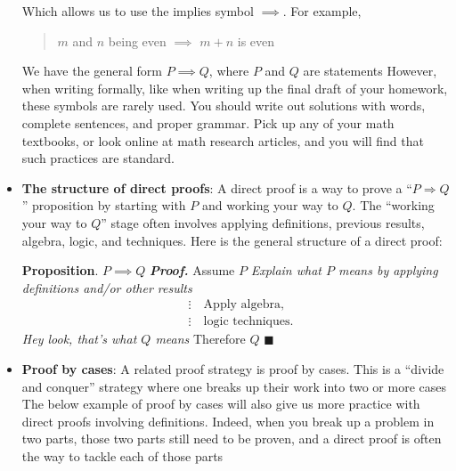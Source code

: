 \documentclass{report}
\begin{document}
\begin{itemize}
            Which allows us to use the implies symbol $\implies$. For example, 
            \begin{quote}
               $m$ and $n$ being even $\implies$ $m+n$ is even 
            \end{quote}
            We have the general form $P \implies Q$, where $P$  and $Q$ are statements
            \bigbreak \noindent 
             However, when writing formally, like when writing up the final draft of your homework, these symbols are rarely used. You should write out solutions with words, complete sentences, and proper grammar. Pick up any of your math textbooks, or look online at math research articles, and you will find that such practices are standard.
        \item \textbf{The structure of direct proofs}: A direct proof is a way to prove a “$P \Rightarrow Q$” proposition by starting with $P$ and working your way to $Q$. The “working your way to $Q$” stage often involves applying definitions, previous results, algebra, logic, and techniques. Here is the general structure of a direct proof:
            \bigbreak \noindent 
            \begin{mdframed}
                \textbf{Proposition}. $P\implies Q$
                \bigbreak \noindent 
                \textbf{\textit{Proof.}} Assume $P$
                \bigbreak \noindent 
                \hspace{1cm}\textit{Explain what $P $ means by applying definitions and/or other results}
                \begin{align*}
                    &\vdots \quad \text{Apply algebra,} \\
                    &\vdots \quad \text{logic techniques}
                .\end{align*}
                \bigbreak \noindent 
                \hspace{1cm} \textit{Hey look, that's what $Q$ means}
                \bigbreak \noindent 
                Therefore $Q$ \hspace{10cm} $\blacksquare $
            \end{mdframed}
        \item \textbf{Proof by cases}: A related proof strategy is proof by cases. This is a “divide and conquer” strategy where one breaks up their work into two or more cases 
            \bigbreak \noindent 
            The below example of proof by cases will also give us more practice with direct proofs involving definitions. Indeed, when you break up a problem in two parts, those two parts still need to be proven, and a direct proof is often the way to tackle each of those parts

\end{itemize}
\end{document}
